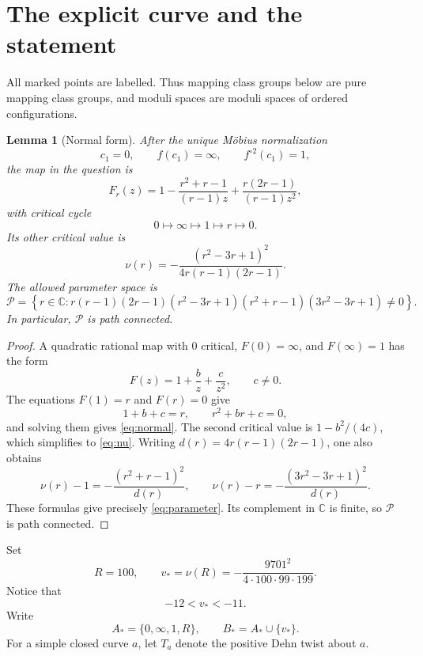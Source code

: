 \documentclass[11pt]{article}
\newcommand{\C}{\mathbb C}
\newcommand{\Par}{\mathcal P}
\newtheorem{lemma}[theorem]{Lemma}
\theoremstyle{definition}
\theoremstyle{remark}
\begin{document}
\section{The explicit curve and the statement}

All marked points are labelled.  Thus mapping class groups below are
pure mapping class groups, and moduli spaces are moduli spaces of
ordered configurations.

\begin{lemma}[Normal form]\label{lem:normal}
After the unique M\"obius normalization
\[
c_1=0,\qquad f(c_1)=\infty,\qquad f^{\circ 2}(c_1)=1,
\]
the map in the question is
\begin{equation}\label{eq:normal}
F_r(z)=
1-\frac{r^2+r-1}{(r-1)z}
+\frac{r(2r-1)}{(r-1)z^2},
\end{equation}
with critical cycle
\[
0\longmapsto\infty\longmapsto1\longmapsto r\longmapsto0.
\]
Its other critical value is
\begin{equation}\label{eq:nu}
\nu(r)=
-\frac{(r^2-3r+1)^2}{4r(r-1)(2r-1)}.
\end{equation}
The allowed parameter space is
\begin{equation}\label{eq:parameter}
\Par=
\left\{
r\in\C:
r(r-1)(2r-1)
(r^2-3r+1)(r^2+r-1)(3r^2-3r+1)\ne0
\right\}.
\end{equation}
In particular, $\Par$ is path connected.
\end{lemma}

\begin{proof}
A quadratic rational map with $0$ critical, $F(0)=\infty$, and
$F(\infty)=1$ has the form
\[
F(z)=1+\frac b z+\frac c{z^2},\qquad c\ne0.
\]
The equations $F(1)=r$ and $F(r)=0$ give
\[
1+b+c=r,\qquad r^2+br+c=0,
\]
and solving them gives \eqref{eq:normal}.  The second critical value is
$1-b^2/(4c)$, which simplifies to \eqref{eq:nu}.
Writing $d(r)=4r(r-1)(2r-1)$, one also obtains
\[
\nu(r)-1=-\frac{(r^2+r-1)^2}{d(r)},\qquad
\nu(r)-r=-\frac{(3r^2-3r+1)^2}{d(r)}.
\]
These formulas give precisely \eqref{eq:parameter}.  Its complement
in $\C$ is finite, so $\Par$ is path connected.
\end{proof}

Set
\[
R=100,\qquad
v_*=\nu(R)=-\frac{9701^2}{4\cdot100\cdot99\cdot199}.
\]
Notice that
\begin{equation}\label{eq:vbound}
-12<v_*<-11.
\end{equation}
Write
\[
A_*=\{0,\infty,1,R\},\qquad B_*=A_*\cup\{v_*\}.
\]
For a simple closed curve $a$, let $T_a$ denote the positive Dehn twist
about $a$.
\end{document}
